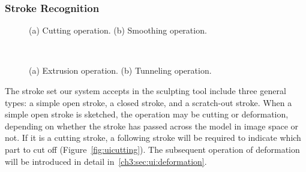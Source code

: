 \subsubsection{Stroke Recognition}\label{ch3:sec:ui:StrReco}

\begin{figure} [htbp]
  \centering
  \caption{(a) Cutting operation. (b) Smoothing operation.}
  \label{fig:uicuttingsmoothing} %
\end{figure}

\begin{figure} [htbp]
  \centering
  \\
  \caption{(a) Extrusion operation. (b) Tunneling operation.}
  \label{fig:uiextrusiontunneling} %
\end{figure}


The stroke set our system accepts in the sculpting tool include three general types: a simple open stroke, a closed stroke, and a scratch-out stroke. When a simple open stroke is sketched, the operation may be cutting or deformation, depending on whether the stroke has passed across the model in image space or not. If it is a cutting stroke, a following stroke will be required to indicate which part to cut off (Figure~\ref{fig:uicutting}). The subsequent operation of deformation will be introduced in detail in~\ref{ch3:sec:ui:deformation}.

